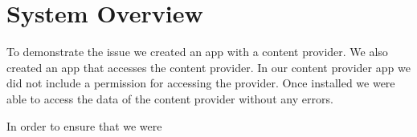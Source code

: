 \section{System Overview}
\label{overview}
To demonstrate the issue we created an app with a content provider. We also created an app that accesses the content provider. In our content provider app we did not include a permission for accessing the provider. Once installed we were able to access the data of the content provider without any errors.

In order to ensure that we were

